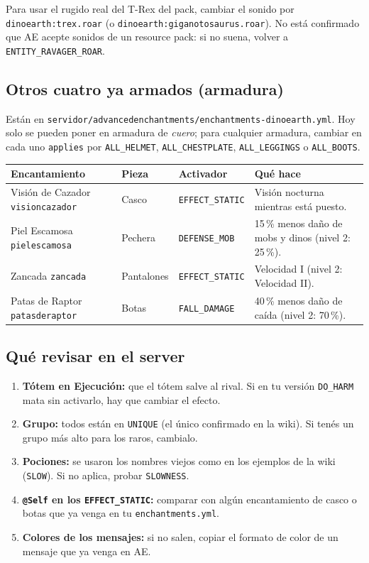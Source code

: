\documentclass[11pt,a4paper]{article}
\newcommand{\tr}[1]{\texttt{\small #1}}           %
\begin{document}
Para usar el rugido real del T-Rex del pack, cambiar el sonido por \tr{dinoearth:trex.roar} (o
\tr{dinoearth:giganotosaurus.roar}). No está confirmado que AE acepte sonidos de un resource pack: si no suena,
volver a \tr{ENTITY\_RAVAGER\_ROAR}.

\subsection{Otros cuatro ya armados (armadura)}
Están en \tr{servidor/advancedenchantments/enchantments-dinoearth.yml}. Hoy solo se pueden poner en armadura de
\emph{cuero}; para cualquier armadura, cambiar en cada uno \tr{applies} por \tr{ALL\_HELMET},
\tr{ALL\_CHESTPLATE}, \tr{ALL\_LEGGINGS} o \tr{ALL\_BOOTS}.

\begin{longtable}{L{3.4cm} L{1.9cm} L{2.9cm} L{7.1cm}}
\toprule
\textbf{Encantamiento} & \textbf{Pieza} & \textbf{Activador} & \textbf{Qué hace}\\
\midrule
\endhead
Visión de Cazador \tr{visioncazador} & Casco & \tr{EFFECT\_STATIC} & Visión nocturna mientras está puesto.\\
Piel Escamosa \tr{pielescamosa} & Pechera & \tr{DEFENSE\_MOB} & 15\,\% menos daño de mobs y dinos (nivel 2: 25\,\%).\\
Zancada \tr{zancada} & Pantalones & \tr{EFFECT\_STATIC} & Velocidad I (nivel 2: Velocidad II).\\
Patas de Raptor \tr{patasderaptor} & Botas & \tr{FALL\_DAMAGE} & 40\,\% menos daño de caída (nivel 2: 70\,\%).\\
\bottomrule
\end{longtable}

\subsection{Qué revisar en el server}
\begin{enumerate}[leftmargin=*]
  \item \textbf{Tótem en Ejecución:} que el tótem salve al rival. Si en tu versión \tr{DO\_HARM} mata sin activarlo, hay que cambiar el efecto.
  \item \textbf{Grupo:} todos están en \tr{UNIQUE} (el único confirmado en la wiki). Si tenés un grupo más alto para los raros, cambialo.
  \item \textbf{Pociones:} se usaron los nombres viejos como en los ejemplos de la wiki (\tr{SLOW}). Si no aplica, probar \tr{SLOWNESS}.
  \item \textbf{\tr{@Self} en los \tr{EFFECT\_STATIC}:} comparar con algún encantamiento de casco o botas que ya venga en tu \tr{enchantments.yml}.
  \item \textbf{Colores de los mensajes:} si no salen, copiar el formato de color de un mensaje que ya venga en AE.
\end{enumerate}
\end{document}

